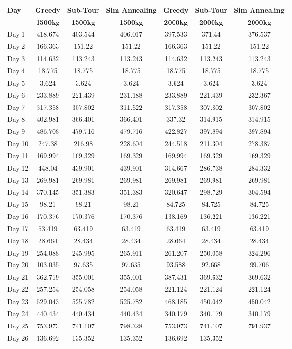 \documentclass[11pt]{article}
\begin{document}
\begin{table}[H]
\centering
\begin{tabular}{l|c|c|c|c|c|c}
\hline
\textbf{Day} & \textbf{Greedy} & \textbf{Sub-Tour} & \textbf{Sim Annealing} & \textbf{Greedy} & \textbf{Sub-Tour} & \textbf{Sim Annealing} \\
   & \textbf{1500kg} & \textbf{1500kg} & \textbf{1500kg} & \textbf{2000kg} & \textbf{2000kg} & \textbf{2000kg} \\

\hline

Day 1 & 418.674 & 403.544 & 406.017 & 397.533 & 371.44 & 376.537 \\ Day 2 & 166.363 & 151.22 & 151.22 & 166.363 & 151.22 & 151.22 \\ Day 3 & 114.632 & 113.243 & 113.243 & 114.632 & 113.243 & 113.243 \\ Day 4 & 18.775 & 18.775 & 18.775 & 18.775 & 18.775 & 18.775 \\ Day 5 & 3.624 & 3.624 & 3.624 & 3.624 & 3.624 & 3.624 \\ Day 6 & 233.889 & 221.439 & 231.188 & 233.889 & 221.439 & 232.367 \\ Day 7 & 317.358 & 307.802 & 311.522 & 317.358 & 307.802 & 307.802 \\ Day 8 & 402.981 & 366.401 & 366.401 & 337.32 & 314.915 & 314.915 \\ Day 9 & 486.708 & 479.716 & 479.716 & 422.827 & 397.894 & 397.894 \\ Day 10 & 247.38 & 216.98 & 228.604 & 244.518 & 211.304 & 278.387 \\ Day 11 & 169.994 & 169.329 & 169.329 & 169.994 & 169.329 & 169.329 \\ Day 12 & 448.04 & 439.901 & 439.901 & 314.667 & 286.738 & 284.332 \\ Day 13 & 269.981 & 269.981 & 269.981 & 269.981 & 269.981 & 269.981 \\ Day 14 & 370.145 & 351.383 & 351.383 & 320.647 & 298.729 & 304.594 \\ Day 15 & 98.21 & 98.21 & 98.21 & 84.725 & 84.725 & 84.725 \\ Day 16 & 170.376 & 170.376 & 170.376 & 138.169 & 136.221 & 136.221 \\ Day 17 & 63.419 & 63.419 & 63.419 & 63.419 & 63.419 & 63.419 \\ Day 18 & 28.664 & 28.434 & 28.434 & 28.664 & 28.434 & 28.434 \\ Day 19 & 254.088 & 245.995 & 265.911 & 261.207 & 250.058 & 324.296 \\ Day 20 & 103.035 & 97.635 & 97.635 & 93.588 & 92.668 & 99.706 \\ Day 21 & 362.719 & 355.001 & 355.001 & 387.431 & 369.632 & 369.632 \\ Day 22 & 257.254 & 254.058 & 254.058 & 221.124 & 221.124 & 221.124 \\ Day 23 & 529.043 & 525.782 & 525.782 & 468.185 & 450.042 & 450.042 \\ Day 24 & 440.434 & 440.434 & 440.434 & 340.179 & 340.179 & 340.179 \\ Day 25 & 753.973 & 741.107 & 798.328 & 753.973 & 741.107 & 791.937 \\ Day 26 & 136.692 & 135.352 & 135.352 & 136.692 & 135.352 
\end{tabular}
\end{table}
\end{document}
